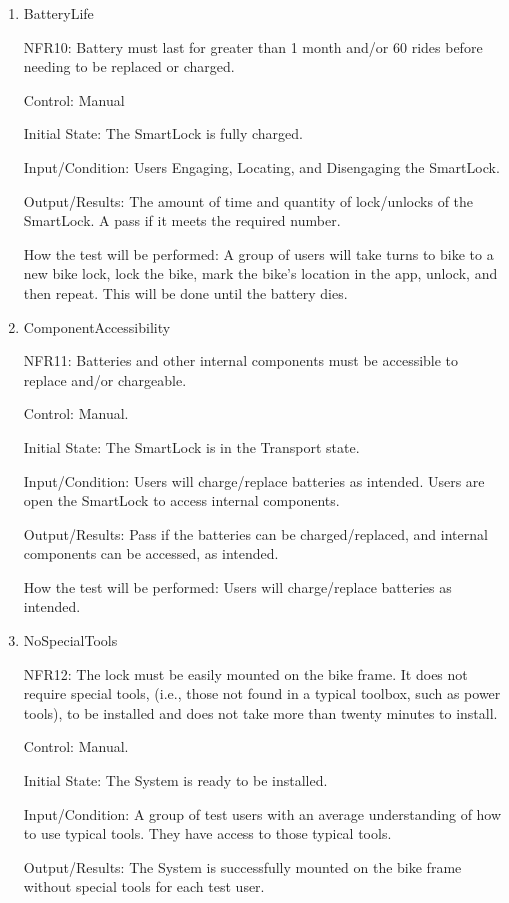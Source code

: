 \documentclass[12pt, titlepage]{article}
\begin{document}
\begin{enumerate}
\item{BatteryLife

NFR10: Battery must last for greater than 1 month and/or 60 rides before needing to be replaced or charged.  }

Control: Manual 

Initial State: The SmartLock is fully charged.

Input/Condition: Users Engaging, Locating, and Disengaging the SmartLock.

Output/Results: The amount of time and quantity of lock/unlocks of the SmartLock. A pass if it meets the required number.

How the test will be performed:  A group of users will take turns to bike to a new bike lock, lock the bike, mark the bike's location in the app, unlock, and then repeat. This will be done until the battery dies.

\item{ComponentAccessibility

NFR11: Batteries and other internal components must be accessible to replace and/or chargeable. }

Control: Manual.

Initial State: The SmartLock is in the Transport state.

Input/Condition: Users will charge/replace batteries as intended. Users are open the SmartLock to access internal components.

Output/Results: Pass if the batteries can be charged/replaced, and internal components can be accessed, as intended.

How the test will be performed: Users will charge/replace batteries as intended.

\item{NoSpecialTools

NFR12: The lock must be easily mounted on the bike frame. It does not require special tools, (i.e., those not found in a typical toolbox, such as power tools), to be installed and does not take more than twenty minutes to install. }

Control: Manual.

Initial State: The System is ready to be installed.  

Input/Condition: A group of test users with an average understanding of how to use typical tools. They have access to those typical tools. 

Output/Results: The System is successfully mounted on the bike frame without special tools for each test user. 


\end{enumerate}
\end{document}
